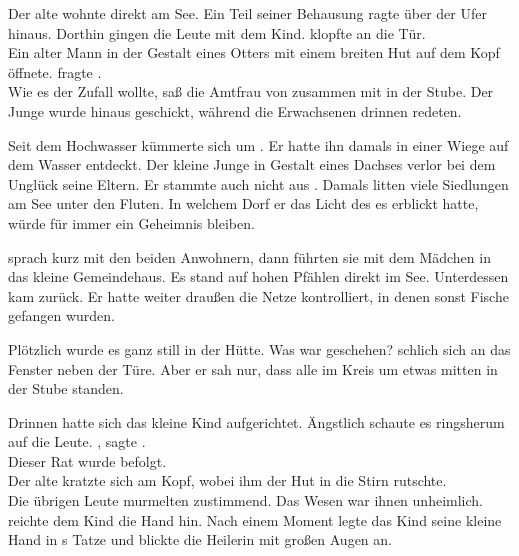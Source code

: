 \begin{Large}
Der alte {\Marn} wohnte direkt am See. Ein Teil seiner Behausung ragte über der Ufer hinaus. Dorthin gingen die Leute mit dem Kind. {\Nox} klopfte an die Tür.\\
Ein alter Mann in der Gestalt eines Otters mit einem breiten Hut auf dem Kopf öffnete.
 fragte {\Nox}. \\
Wie es der Zufall wollte, saß die Amtfrau von {\AltBerna} zusammen mit {\Piedo} in der Stube. Der Junge wurde hinaus geschickt, während die Erwachsenen drinnen redeten.

Seit dem Hochwasser kümmerte sich {\Marn} um {\Piedo}. Er hatte ihn damals in einer Wiege auf dem Wasser entdeckt. Der kleine Junge in Gestalt eines Dachses verlor bei dem Unglück seine Eltern. Er stammte auch nicht aus {\AltBerna}. Damals litten viele Siedlungen am See unter den Fluten. In welchem Dorf er das Licht des {\Enland}es erblickt hatte, würde für immer ein Geheimnis bleiben.

{\Lobo} sprach kurz mit den beiden Anwohnern, dann führten sie {\Nox} mit dem Mädchen in das kleine Gemeindehaus. Es stand auf hohen Pfählen direkt im See. Unterdessen kam {\Piedo} zurück. Er hatte weiter draußen die Netze kontrolliert, in denen sonst Fische gefangen wurden.

Plötzlich wurde es ganz still in der Hütte. Was war geschehen? {\Piedo} schlich sich an das Fenster neben der Türe. Aber er sah nur, dass alle im Kreis um etwas mitten in der Stube standen.

Drinnen hatte sich das kleine Kind aufgerichtet. Ängstlich schaute es ringsherum auf die Leute. , sagte {\Tea}.\\
Dieser Rat wurde befolgt.\\
Der alte {\Marn} kratzte sich am Kopf, wobei ihm der Hut in die Stirn rutschte. \\
Die übrigen Leute murmelten zustimmend. Das Wesen war ihnen unheimlich. {\Salbana} reichte dem Kind die Hand hin. Nach einem Moment legte das Kind seine kleine Hand in {\Salbana}s Tatze und blickte die Heilerin mit großen Augen an.\\


\end{Large}
